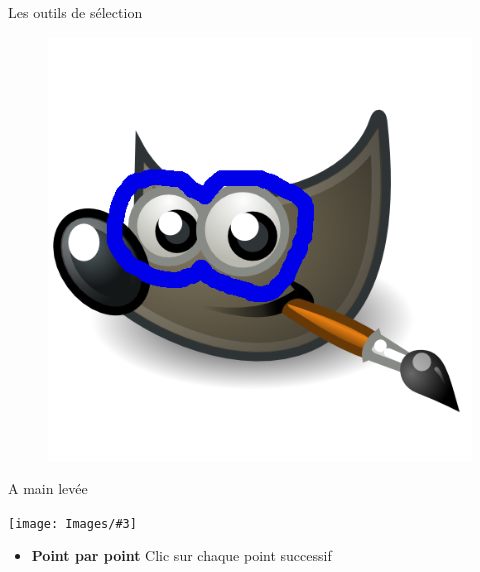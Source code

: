 \documentclass[10pt,svgnames,usenames,table]{beamer}
\newcommand{\tool}[3]{%
	\begin{minipage}{0.40\textwidth}
	\item #1	
	\end{minipage}\hfill
	\begin{minipage}{0.20\textwidth}
	\begin{flushright}
	\keys{#2}
	\end{flushright}
	\end{minipage}
	\begin{minipage}{0.06\textwidth}
	\fbox{ou}
	\end{minipage}
	\begin{minipage}{0.1\textwidth}
	\texttt{[image: Images/\#3]}
	\end{minipage}
}
\begin{document}
\begin{frame}[allowframebreaks]{Les outils de sélection}
\begin{enumerate}
\begin{minipage}{0.45\textwidth}
\begin{figure}
        		\includegraphics[width=\textwidth]{Images/main_levee.png} 
		\end{figure}
		\end{minipage}
		
	\framebreak
	
	\setcounter{enumi}{3}
	\tool{A main levée}{F}{freeSelect.png}

	\begin{itemize}
		\item \textbf{Point par point} Clic sur chaque point successif 
	\end{itemize}
	

\end{enumerate}
\end{frame}
\end{document}

